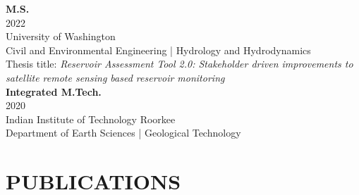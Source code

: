 \documentclass[a4paper,9pt]{extarticle}
\begin{document}
    \noindent
    \textbf{M.S.} \\
    2022 \\
    University of Washington \\
    Civil and Environmental Engineering | Hydrology and Hydrodynamics \\
    Thesis title: \textit{Reservoir Assessment Tool 2.0: Stakeholder driven improvements to satellite remote sensing based reservoir monitoring} \\

    \noindent
    \textbf{Integrated M.Tech.} \\
    2020 \\
    Indian Institute of Technology Roorkee \\
    Department of Earth Sciences | Geological Technology

\section*{PUBLICATIONS}
\end{document}
